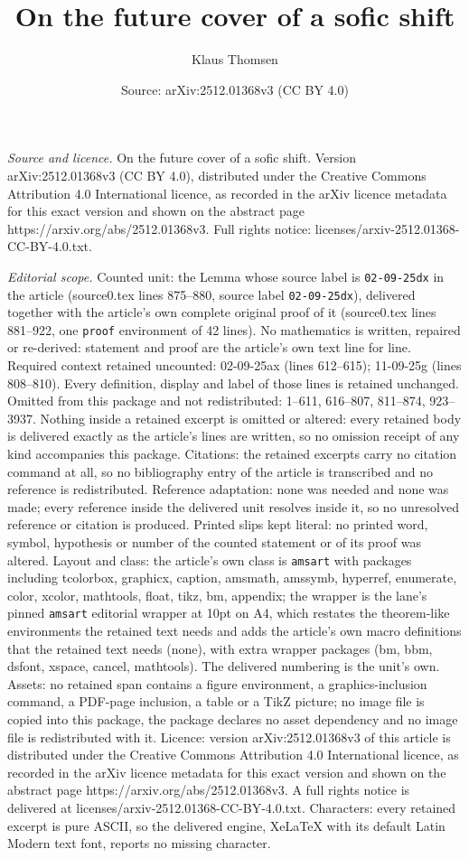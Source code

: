 \documentclass[10pt,a4paper]{amsart}
\title[On the future cover of a sofic shift]{On the future cover of a sofic shift}
\author{Klaus Thomsen}
\date{Source: arXiv:2512.01368v3 (CC BY 4.0)}
\begin{document}
\maketitle

\noindent\emph{Source and licence.} On the future cover of a sofic shift. Version arXiv:2512.01368v3 (CC BY 4.0), distributed under the Creative Commons Attribution 4.0 International licence, as recorded in the arXiv licence metadata for this exact version and shown on the abstract page https://arxiv.org/abs/2512.01368v3. Full rights notice: licenses/arxiv-2512.01368-CC-BY-4.0.txt.\par\smallskip

\noindent\textit{Editorial scope.} Counted unit: the Lemma whose source label is \texttt{02-09-25dx} in the article (source0.tex lines 875--880, source label \texttt{02-09-25dx}), delivered together with the article's own complete original proof of it (source0.tex lines 881--922, one \texttt{proof} environment of 42 lines). No mathematics is written, repaired or re-derived: statement and proof are the article's own text line for line. Required context retained uncounted: 02-09-25ax (lines 612--615); 11-09-25g (lines 808--810). Every definition, display and label of those lines is retained unchanged. Omitted from this package and not redistributed: 1--611, 616--807, 811--874, 923--3937. Nothing inside a retained excerpt is omitted or altered: every retained body is delivered exactly as the article's lines are written, so no omission receipt of any kind accompanies this package. Citations: the retained excerpts carry no citation command at all, so no bibliography entry of the article is transcribed and no reference is redistributed. Reference adaptation: none was needed and none was made; every reference inside the delivered unit resolves inside it, so no unresolved reference or citation is produced. Printed slips kept literal: no printed word, symbol, hypothesis or number of the counted statement or of its proof was altered. Layout and class: the article's own class is \texttt{amsart} with packages including tcolorbox, graphicx, caption, amsmath, amssymb, hyperref, enumerate, color, xcolor, mathtools, float, tikz, bm, appendix; the wrapper is the lane's pinned \texttt{amsart} editorial wrapper at 10pt on A4, which restates the theorem-like environments the retained text needs and adds the article's own macro definitions that the retained text needs (none), with extra wrapper packages (bm, bbm, dsfont, xspace, cancel, mathtools). The delivered numbering is the unit's own. Assets: no retained span contains a figure environment, a graphics-inclusion command, a PDF-page inclusion, a table or a TikZ picture; no image file is copied into this package, the package declares no asset dependency and no image file is redistributed with it. Licence: version arXiv:2512.01368v3 of this article is distributed under the Creative Commons Attribution 4.0 International licence, as recorded in the arXiv licence metadata for this exact version and shown on the abstract page https://arxiv.org/abs/2512.01368v3. A full rights notice is delivered at licenses/arxiv-2512.01368-CC-BY-4.0.txt. Characters: every retained excerpt is pure ASCII, so the delivered engine, XeLaTeX with its default Latin Modern text font, reports no missing character.
\end{document}
